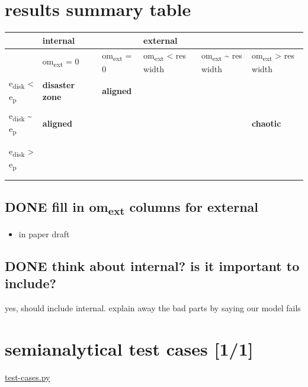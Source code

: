 \documentclass[11pt]{article}
\begin{document}
\section{results summary table}
\label{sec:orgee67b64}

\begin{center}
\begin{tabular}{lllllll}
\hline
 & \textbf{internal} &  &  & \textbf{external} &  & \\
\hline
 & om\textsubscript{ext} = 0 &  & om\textsubscript{ext} = 0 & om\textsubscript{ext} < res width & om\textsubscript{ext} \textasciitilde{} res width & om\textsubscript{ext} > res width\\
\hline
e\textsubscript{disk} < e\textsubscript{p} & \textbf{disaster zone} &  & \textbf{aligned} &  &  & \\
 &  &  &  &  &  & \\
\hline
e\textsubscript{disk} \textasciitilde{} e\textsubscript{p} & \textbf{aligned} &  &  &  &  & \textbf{chaotic}\\
 &  &  &  &  &  & \\
 &  &  &  &  &  & \\
\hline
e\textsubscript{disk} > e\textsubscript{p} &  &  &  &  &  & \\
 &  &  &  &  &  & \\
 &  &  &  &  &  & \\
\hline
\end{tabular}
\end{center}

\subsection{{\bfseries\sffamily DONE} fill in om\textsubscript{ext} columns for external}
\label{sec:org51bd0bf}
\begin{itemize}
\item in paper draft
\end{itemize}
\subsection{{\bfseries\sffamily DONE} think about internal? is it important to include?}
\label{sec:org2853043}
yes, should include internal. explain away the bad parts by saying our
model fails

\section{semianalytical test cases [1/1]}
\label{sec:org53849ec}
\url{test-cases.py}
\end{document}
